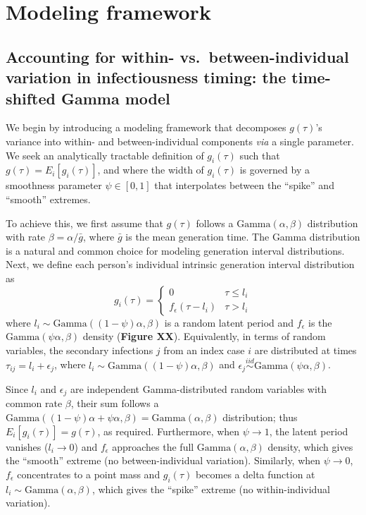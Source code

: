 \section{Modeling framework}

\subsection{Accounting for within- vs.~between-individual variation in infectiousness timing: the time-shifted Gamma model}
We begin by introducing a modeling framework that decomposes $g(\tau)$'s variance into within- and between-individual components {\it via} a single parameter. We seek an analytically tractable definition of $g_i(\tau)$ such that $g(\tau) = E_i[g_i(\tau)]$, and where the width of $g_i(\tau)$ is governed by a smoothness parameter $\psi \in [0,1]$ that interpolates between the ``spike'' and ``smooth'' extremes. 

To achieve this, we first assume that $g(\tau)$ follows a $\text{Gamma}(\alpha, \beta)$ distribution with rate $\beta = \alpha / \bar{g}$, where $\bar{g}$ is the mean generation time. The Gamma distribution is a natural and common choice for modeling generation interval distributions. Next, we define each person's individual intrinsic generation interval distribution as 
%
\begin{equation}
	g_i(\tau) = \begin{cases}
		0 & \tau \leq l_i \\ 
		f_\epsilon(\tau - l_i) & \tau > l_i
	\end{cases}
\end{equation}
%
where $l_i \sim \text{Gamma}((1-\psi)\alpha, \beta)$ is a random latent period and $f_\epsilon$ is the $\text{Gamma}(\psi \alpha, \beta)$ density ({\bf Figure XX}). Equivalently, in terms of random variables, the secondary infections $j$ from an index case $i$ are distributed at times $\tau_{ij} = l_i + \epsilon_j$, where $l_i \sim \text{Gamma}((1-\psi)\alpha, \beta)$ and $\epsilon_j \overset{iid}{\sim} \text{Gamma}(\psi \alpha, \beta)$. 

Since $l_i$ and $\epsilon_j$ are independent Gamma-distributed random variables with common rate $\beta$, their sum follows a $\text{Gamma}((1-\psi) \alpha + \psi \alpha, \beta) = \text{Gamma}(\alpha, \beta)$ distribution; thus $E_i[g_i(\tau)] = g(\tau)$, as required. Furthermore, when $\psi \rightarrow 1$, the latent period vanishes ($l_i \rightarrow 0$) and $f_\epsilon$ approaches the full $\text{Gamma}(\alpha, \beta)$ density, which gives the ``smooth'' extreme (no between-individual variation). Similarly, when $\psi \rightarrow 0$, $f_\epsilon$ concentrates to a point mass and $g_i(\tau)$ becomes a delta function at $l_i \sim \text{Gamma}(\alpha, \beta)$, which gives the ``spike'' extreme (no within-individual variation). 

